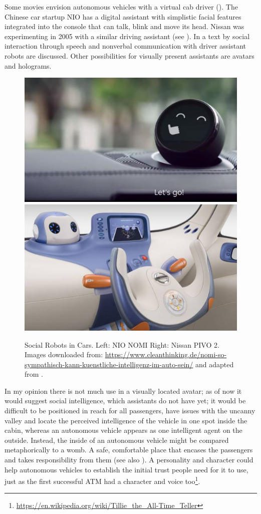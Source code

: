 Some movies envision autonomous vehicles with a virtual cab driver (\emph{}). The Chinese car startup NIO has a digital assistant with simplistic facial features integrated into the console that can talk, blink and move its head. Nissan was experimenting in 2005 with a similar driving assistant (see \emph{}). In a text by \citet{Perchonok2009FacilitatingLiterature} social interaction through speech and nonverbal communication with driver assistant robots are discussed. Other possibilities for visually present assistants are avatars and holograms. 
\begin{figure}
    \includegraphics[height=0.28\textwidth]{fig/NOMI}\hfill\includegraphics[height=0.28\textwidth]{fig/PIVO}
    \caption[Social Robots in Cars]{Social Robots in Cars. Left: NIO NOMI 
   Right: Nissan PIVO 2. Images downloaded from: \url{https://www.cleanthinking.de/nomi-so-sympathisch-kann-kuenstliche-intelligenz-im-auto-sein/} and adapted from \cite{Perchonok2009FacilitatingLiterature}.}
    \label{fig:robots}
\end{figure}

In my opinion there is not much use in a visually located  avatar; as of now it would suggest social intelligence, which assistants do not have yet; it would be difficult to be positioned in reach for all passengers, have issues with the uncanny valley and locate the perceived intelligence of the vehicle in one spot inside the cabin, whereas an autonomous vehicle appears as one intelligent agent on the outside. Instead, the inside of an autonomous vehicle might be compared metaphorically to a womb. A safe, comfortable place that encases the passengers and takes responsibility from them (see also \emph{}). A personality and character could help autonomous vehicles to establish the initial trust people need for it to use, just as the first successful ATM had a character and voice too\footnote{\url{https://en.wikipedia.org/wiki/Tillie_the_All-Time_Teller}}.

